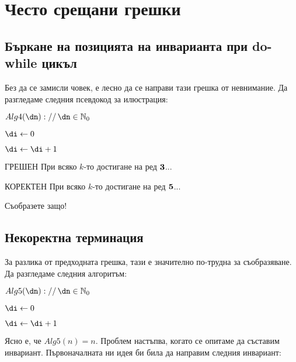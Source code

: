 \section{Често срещани грешки}

\subsection{Бъркане на позицията на инварианта при do-while цикъл}

Без да се замисли човек, е лесно да се направи тази грешка от невнимание. Да разгледаме следния псевдокод за илюстрация:

\begin{pseudocode}
	
	$Alg4(\dn)://\,\dn\in\mathbb{N}_0$
	\Mybegin
	{
		$\di\leftarrow0$\;
		
		\Do{$\di<\dn$}
		{
			$\di\leftarrow\di+1$\;
		}
	
		\KwRet{$\dn$\;}
	}
\end{pseudocode}

\begin{boxinvariant*}{ГРЕШЕН}{}
	При всяко $k$-то достигане на ред $\textbf3$...
\end{boxinvariant*}
\vspace{0.3cm}
\begin{boxinvariant*}{КОРЕКТЕН}{}
	При всяко $k$-то достигане на ред $\textbf5$...
\end{boxinvariant*}
\vspace{0.3cm}\noindent
Съобразете защо!\newpage

\subsection{Некоректна терминация}

За разлика от предходната грешка, тази е значително по-трудна за съобразяване. Да разгледаме следния алгоритъм:
\begin{pseudocode}
	
	$Alg5(\dn)://\,\dn\in\mathbb{N}_0$
	\Mybegin
	{
		$\di\leftarrow0$\;
		
		\While{$\di<\dn$}
		{
			$\di\leftarrow\di+1$\;
		}
		
		\KwRet{$\dn$\;}
	}
\end{pseudocode}
Ясно е, че $Alg5(n)=n$. Проблем настъпва, когато се опитаме да съставим инвариант. Първоначалната ни идея би била да направим следния инвариант:

